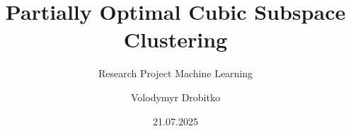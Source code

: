 \documentclass[t]{beamer}
\title{\Large Partially Optimal Cubic Subspace Clustering}
\subtitle{\small Research Project Machine Learning}
\author{Volodymyr Drobitko}
\institute{Technische Universität Dresden}
\date{21.07.2025}
\begin{document}
\frame{\titlepage}

\frame{\tableofcontents}
\end{document}
